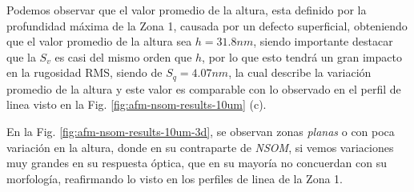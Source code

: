 Podemos observar que el valor promedio de la altura, esta definido por la profundidad máxima de la Zona 1, causada por un defecto superficial, obteniendo que el valor promedio de la altura sea $h = 31.8 nm$, siendo importante destacar que la $S_{v}$ es casi del mismo orden que $ h $, por lo que esto tendrá un gran impacto en la rugosidad RMS, siendo de $ S_{q}=4.07nm $, la cual describe la variación promedio de la altura y este valor es comparable con lo observado en el perfil de linea visto en la Fig. \ref{fig:afm-nsom-results-10um} (c).

En la Fig. \ref{fig:afm-nsom-results-10um-3d}, se observan zonas \textit{planas} o con poca variación en la altura, donde en su contraparte de \textit{NSOM}, si vemos variaciones muy grandes en su respuesta óptica, que en su mayoría no concuerdan con su morfología, reafirmando lo visto en los perfiles de linea de la Zona 1.

